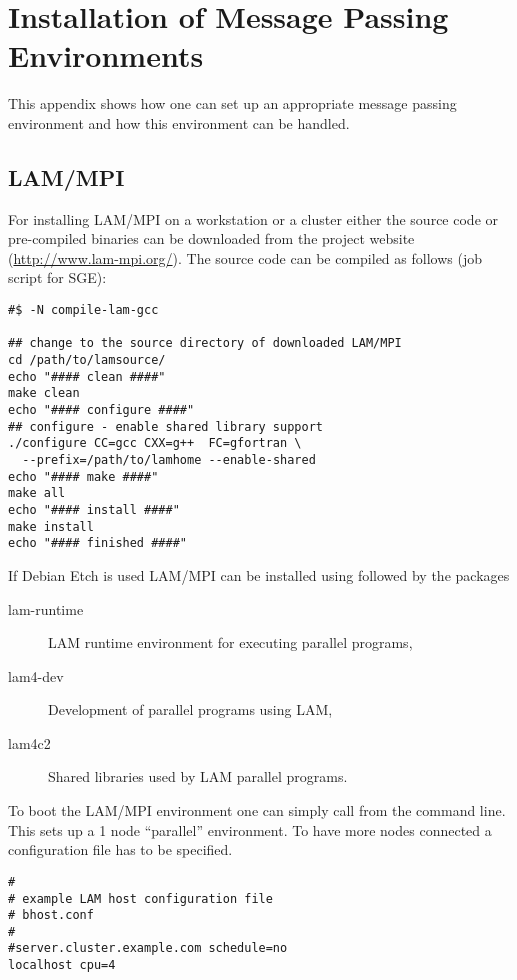 
\chapter{Installation of Message Passing Environments}
\label{app:mpi_imp}

This appendix shows how one can set up an appropriate message
passing environment and how this environment can be handled.

\section{LAM/MPI}

For installing LAM/MPI on a workstation or a cluster
either the source code or pre-compiled binaries can be downloaded from
the project website (\url{http://www.lam-mpi.org/}).
The source code can be compiled as follows (job script for SGE):

\begin{verbatim}
#$ -N compile-lam-gcc

## change to the source directory of downloaded LAM/MPI
cd /path/to/lamsource/
echo "#### clean ####"
make clean
echo "#### configure ####"
## configure - enable shared library support
./configure CC=gcc CXX=g++  FC=gfortran \
  --prefix=/path/to/lamhome --enable-shared
echo "#### make ####"
make all
echo "#### install ####"
make install
echo "#### finished ####"
\end{verbatim}

If Debian Etch is used LAM/MPI can be installed using \code{apt-get
  install} followed by the packages

\begin{description}
\item[lam-runtime] LAM runtime environment for executing parallel programs,
\item[lam4-dev] Development of parallel programs using LAM,
\item[lam4c2] Shared libraries used by LAM parallel programs.
\end{description}

To boot the LAM/MPI environment one can simply call 
from the command line. This sets up a 1 node ``parallel''
environment. To have more nodes connected a configuration file has to
be specified.

\begin{verbatim}
#
# example LAM host configuration file
# bhost.conf
#
#server.cluster.example.com schedule=no
localhost cpu=4
\end{verbatim}

